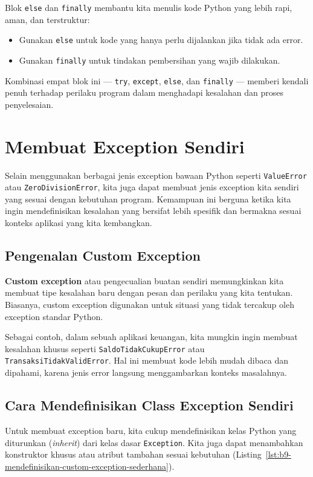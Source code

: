 Blok \texttt{else} dan \texttt{finally} membantu kita menulis kode Python yang lebih rapi, aman, dan terstruktur:
\begin{itemize}
    \item Gunakan \texttt{else} untuk kode yang hanya perlu dijalankan jika tidak ada error.
    \item Gunakan \texttt{finally} untuk tindakan pembersihan yang wajib dilakukan.
\end{itemize}

Kombinasi empat blok ini — \texttt{try}, \texttt{except}, \texttt{else}, dan \texttt{finally} — memberi kendali penuh terhadap perilaku program dalam menghadapi kesalahan dan proses penyelesaian.


\section{Membuat Exception Sendiri}

Selain menggunakan berbagai jenis exception bawaan Python seperti \texttt{ValueError} atau \texttt{ZeroDivisionError}, kita juga dapat membuat jenis exception kita sendiri yang sesuai dengan kebutuhan program. Kemampuan ini berguna ketika kita ingin mendefinisikan kesalahan yang bersifat lebih spesifik dan bermakna sesuai konteks aplikasi yang kita kembangkan.

\subsection*{Pengenalan Custom Exception}

\textbf{Custom exception} atau pengecualian buatan sendiri memungkinkan kita membuat tipe kesalahan baru dengan pesan dan perilaku yang kita tentukan. Biasanya, custom exception digunakan untuk situasi yang tidak tercakup oleh exception standar Python.

Sebagai contoh, dalam sebuah aplikasi keuangan, kita mungkin ingin membuat kesalahan khusus seperti \texttt{SaldoTidakCukupError} atau \texttt{TransaksiTidakValidError}. Hal ini membuat kode lebih mudah dibaca dan dipahami, karena jenis error langsung menggambarkan konteks masalahnya.

\subsection*{Cara Mendefinisikan Class Exception Sendiri}

Untuk membuat exception baru, kita cukup mendefinisikan kelas Python yang diturunkan (\textit{inherit}) dari kelas dasar \texttt{Exception}. Kita juga dapat menambahkan konstruktor khusus atau atribut tambahan sesuai kebutuhan (Listing~\ref{lst:b9-mendefinisikan-custom-exception-sederhana}).


